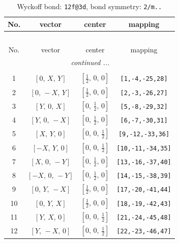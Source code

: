 \documentclass[fleqn,8pt]{jsarticle}
\begin{document}
\renewcommand{\arraystretch}{1.2}
\begin{longtable}{cccc}
\caption{Wyckoff bond: {\tt 12f@3d}, bond symmetry: {\tt 2/m..}}
 \\
 \hline \hline
No. & vector & center & mapping \\ \hline \endfirsthead

\multicolumn{3}{l}{\tablename\ \thetable{}} \\
 \hline \hline
No. & vector & center & mapping \\ \hline \endhead

 \hline \hline
\multicolumn{3}{r}{\footnotesize\it continued ...} \\ \endfoot

 \hline \hline
\multicolumn{3}{r}{} \\ \endlastfoot

1 & $\left[ 0,\, X,\, Y \right]$ & $\left[ \frac{1}{2},\, 0,\, 0 \right]$ & {\tt [1,-4,-25,28]} \\ \hline
2 & $\left[ 0,\, - X,\, Y \right]$ & $\left[ \frac{1}{2},\, 0,\, 0 \right]$ & {\tt [2,-3,-26,27]} \\ \hline
3 & $\left[ Y,\, 0,\, X \right]$ & $\left[ 0,\, \frac{1}{2},\, 0 \right]$ & {\tt [5,-8,-29,32]} \\ \hline
4 & $\left[ Y,\, 0,\, - X \right]$ & $\left[ 0,\, \frac{1}{2},\, 0 \right]$ & {\tt [6,-7,-30,31]} \\ \hline
5 & $\left[ X,\, Y,\, 0 \right]$ & $\left[ 0,\, 0,\, \frac{1}{2} \right]$ & {\tt [9,-12,-33,36]} \\ \hline
6 & $\left[ - X,\, Y,\, 0 \right]$ & $\left[ 0,\, 0,\, \frac{1}{2} \right]$ & {\tt [10,-11,-34,35]} \\ \hline
7 & $\left[ X,\, 0,\, - Y \right]$ & $\left[ 0,\, \frac{1}{2},\, 0 \right]$ & {\tt [13,-16,-37,40]} \\ \hline
8 & $\left[ - X,\, 0,\, - Y \right]$ & $\left[ 0,\, \frac{1}{2},\, 0 \right]$ & {\tt [14,-15,-38,39]} \\ \hline
9 & $\left[ 0,\, Y,\, - X \right]$ & $\left[ \frac{1}{2},\, 0,\, 0 \right]$ & {\tt [17,-20,-41,44]} \\ \hline
10 & $\left[ 0,\, Y,\, X \right]$ & $\left[ \frac{1}{2},\, 0,\, 0 \right]$ & {\tt [18,-19,-42,43]} \\ \hline
11 & $\left[ Y,\, X,\, 0 \right]$ & $\left[ 0,\, 0,\, \frac{1}{2} \right]$ & {\tt [21,-24,-45,48]} \\ \hline
12 & $\left[ Y,\, - X,\, 0 \right]$ & $\left[ 0,\, 0,\, \frac{1}{2} \right]$ & {\tt [22,-23,-46,47]} \\
\end{longtable}
\end{document}
